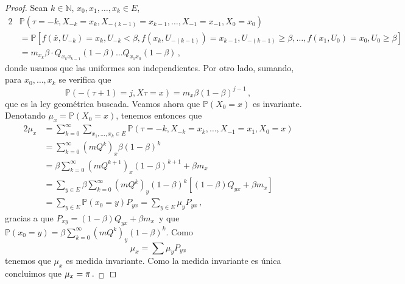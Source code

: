 \documentclass[letterpaper,11pt]{article} %
\theoremstyle{defbreak}
\theoremstyle{propbreak}
\theoremstyle{remark}
\theoremstyle{break}
\def\P{\mathbb{P}}
\def\N{\mathbb{N}}
\def\gris{\color{mygray}}
\def\negro{\color{black}}
\def\findem{\null\hfill\color{white}a\color{black}_\square}
\begin{document}
\begin{proof} %
\gris
Sean $k\in\N$, $x_0,x_1,\dots,x_k\in E$,
\begin{alignat*}{2}
    & \P(\tau = -k,X_{-k}=x_k,X_{-(k-1)}=x_{k-1},\dots,X_{-1}=x_{-1},X_0=x_0) \\ & = \P[f(\bar{x},U_{-k})=x_k,U_{-k}<\beta,f(x_k,U_{-(k-1)})=x_{k-1},U_{-(k-1)}\geq\beta,\dots,f(x_{1},U_0)=x_0,U_0\geq\beta] \\
    & = m_{x_k}\beta\cdot Q_{x_k x_{k-1}}(1-\beta)\dots Q_{x_1 x_0}(1-\beta) \, ,
\end{alignat*}
donde usamos que las uniformes son independientes.
Por otro lado, sumando, para $x_0,\dots,x_k$ se verifica que
$$ \P(-(\tau+1)=j,X\tau=x)=m_x\beta(1-\beta)^{j-1} \, ,$$
que es la ley geométrica buscada. Veamos ahora que $\P(X_0=x)$ es invariante.
\\ Denotando $\mu_x=\P(X_0=x)$, tenemos entonces que 
\begin{alignat*}{2}
    \mu_x & = \displaystyle \sum^\infty_{k=0}\sum_{x_1,\dots,x_k\in E}\P(\tau=-k,X_{-k}=x_k,\dots,X_{-1}=x_1,X_0=x) \\
    & = \sum_{k=0}^\infty(mQ^k)_x\beta(1-\beta)^k \\
    & = \beta\sum^\infty_{k=0}(mQ^{k+1})_x(1-\beta)^{k+1}+\beta m_x \\
    & = \sum_{y\in E}\beta\sum^\infty_{k=0}(mQ^{k})_y(1-\beta)^{k}[(1-\beta)Q_{yx}+\beta m_x] \\
    & = \sum_{y\in E}\P(x_0=y)P_{yx} = \sum_{y\in E}\mu_y P_{yx}\,,
\end{alignat*}
gracias a que $P_{xy}=(1-\beta)Q_{yx}+\beta m_x$\, y que $\P(x_0=y)=\beta\sum^\infty_{k=0}(mQ^{k})_y(1-\beta)^{k}$. Como
$$ \mu_x = \displaystyle\sum \mu_yP_{yx}$$
tenemos que $\mu_x$ es medida invariante. Como la medida invariante es única concluimos que $\mu_x=\pi\, . \findem$
\negro
\end{proof}
\end{document}
